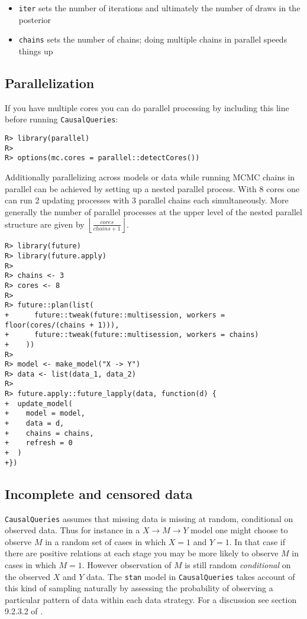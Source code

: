 \documentclass[
  11pt,
  article]{jss}
\providecommand{\tightlist}{%
  \setlength{\itemsep}{0pt}\setlength{\parskip}{0pt}}\usepackage{longtable,booktabs,array}
\begin{document}
\begin{itemize}
\tightlist
\item
  \texttt{iter} sets the number of iterations and ultimately the number
  of draws in the posterior
\item
  \texttt{chains} sets the number of chains; doing multiple chains in
  parallel speeds things up
\end{itemize}

\hypertarget{parallelization}{%
\subsection{Parallelization}\label{parallelization}}

If you have multiple cores you can do parallel processing by including
this line before running \texttt{CausalQueries}:

\begin{verbatim}
R> library(parallel)
R> 
R> options(mc.cores = parallel::detectCores())
\end{verbatim}

Additionally parallelizing across models or data while running MCMC
chains in parallel can be achieved by setting up a nested parallel
process. With 8 cores one can run 2 updating processes with 3 parallel
chains each simultaneously. More generally the number of parallel
processes at the upper level of the nested parallel structure are given
by \(\left \lfloor \frac{cores}{chains + 1} \right \rfloor\).

\begin{verbatim}
R> library(future)
R> library(future.apply)
R> 
R> chains <- 3
R> cores <- 8
R> 
R> future::plan(list(
+      future::tweak(future::multisession, workers = floor(cores/(chains + 1))),
+      future::tweak(future::multisession, workers = chains)
+    ))
R> 
R> model <- make_model("X -> Y")
R> data <- list(data_1, data_2)
R> 
R> future.apply::future_lapply(data, function(d) {
+  update_model(
+    model = model,
+    data = d,
+    chains = chains,
+    refresh = 0
+  )
+})
\end{verbatim}

\hypertarget{incomplete-and-censored-data}{%
\subsection{Incomplete and censored
data}\label{incomplete-and-censored-data}}

\texttt{CausalQueries} assumes that missing data is missing at random,
conditional on observed data. Thus for instance in a
\(X \rightarrow M \rightarrow Y\) model one might choose to observe
\(M\) in a random set of cases in which \(X=1\) and \(Y=1\). In that
case if there are positive relations at each stage you may be more
likely to observe \(M\) in cases in which \(M=1\). However observation
of \(M\) is still random \emph{conditional} on the observed \(X\) and
\(Y\) data. The \texttt{stan} model in \texttt{CausalQueries} takes
account of this kind of sampling naturally by assessing the probability
of observing a particular pattern of data within each data strategy. For
a discussion see section 9.2.3.2 of \citet{ii2023}.
\end{document}
